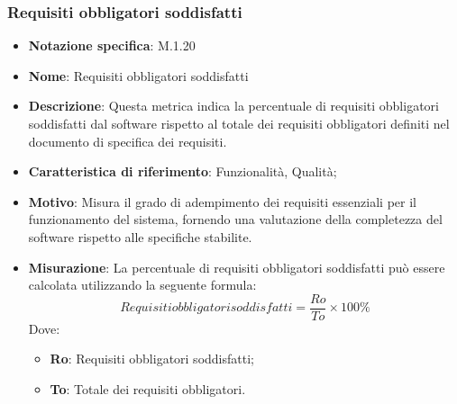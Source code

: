\subsubsection{Requisiti obbligatori soddisfatti}
\begin{itemize}
    \item \textbf{Notazione specifica}: M.1.20
    \item \textbf{Nome}: Requisiti obbligatori soddisfatti
    \item \textbf{Descrizione}: Questa metrica indica la percentuale di requisiti obbligatori soddisfatti dal software rispetto al totale dei requisiti obbligatori definiti nel documento di specifica dei requisiti.
    \item \textbf{Caratteristica di riferimento}: Funzionalità, Qualità;
    \item \textbf{Motivo}: Misura il grado di adempimento dei requisiti essenziali per il funzionamento del sistema, fornendo una valutazione della completezza del software rispetto alle specifiche stabilite.
    \item \textbf{Misurazione}: La percentuale di requisiti obbligatori soddisfatti può essere calcolata utilizzando la seguente formula:
    \[ Requisiti obbligatori soddisfatti= \frac{Ro}{To} \times 100\% \]
    Dove:
    \begin{itemize}
        \item \textbf{Ro}: Requisiti obbligatori soddisfatti;
        \item \textbf{To}: Totale dei requisiti obbligatori.
    \end{itemize}
\end{itemize}
